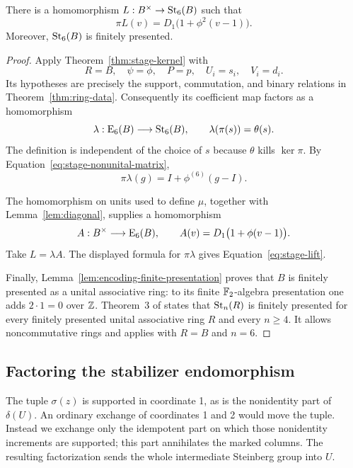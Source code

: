 \begin{lemma}\label{lem:steinberg-lift}
There is a homomorphism
$L:B^\times\to\mathrm{St}_6(B)$ such that
\begin{equation}\label{eq:stage-lift}
 \pi L(v)=D_1\bigl(1+\phi^2(v-1)\bigr).
\end{equation}
Moreover, $\mathrm{St}_6(B)$ is finitely presented.
\end{lemma}

\begin{proof}
Apply Theorem~\ref{thm:stage-kernel} with
\[
 R=B,\quad \psi=\phi,\quad P=p,
 \quad U_i=s_i,\quad V_i=d_i.
\]
Its hypotheses are precisely the support, commutation, and binary
relations in Theorem~\ref{thm:ring-data}.
Consequently its coefficient map factors as a homomorphism
\[
 \lambda:\mathrm E_6(B)\longrightarrow\mathrm{St}_6(B),
 \qquad \lambda(\pi(s))=\theta(s).
\]
The definition is independent of the choice of $s$ because $\theta$
kills $\ker\pi$.  By
Equation~\eqref{eq:stage-nonunital-matrix},
\[
 \pi\lambda(g)=I+\phi^{(6)}(g-I).
\]

The homomorphism on units used to define $\mu$, together with
Lemma~\ref{lem:diagonal}, supplies a homomorphism
\[
 A:B^\times\longrightarrow\mathrm E_6(B),
 \qquad A(v)=D_1\bigl(1+\phi(v-1)\bigr).
\]
Take $L=\lambda A$.  The displayed formula for $\pi\lambda$ gives
Equation~\eqref{eq:stage-lift}.

Finally, Lemma~\ref{lem:encoding-finite-presentation} proves that $B$
is finitely presented as a unital associative ring: to its finite
$\mathbb F_2$-algebra presentation one adds $2\cdot1=0$ over $\mathbb Z$.
Theorem~3 of
\citet{KrsticMcCool1999} states that $\mathrm{St}_n(R)$ is finitely
presented for every finitely presented unital associative ring $R$
and every $n\ge4$.  It allows noncommutative rings and applies with
$R=B$ and $n=6$.
\end{proof}

\subsection{Factoring the stabilizer endomorphism}

The tuple $\sigma(z)$ is supported in coordinate 1, as is the
nonidentity part of $\delta(U)$.  An ordinary exchange of coordinates
1 and 2 would move the tuple.  Instead we exchange only the idempotent
part on which those nonidentity increments are supported; this part
annihilates the marked columns.  The resulting factorization sends the
whole intermediate Steinberg group into $U$.

